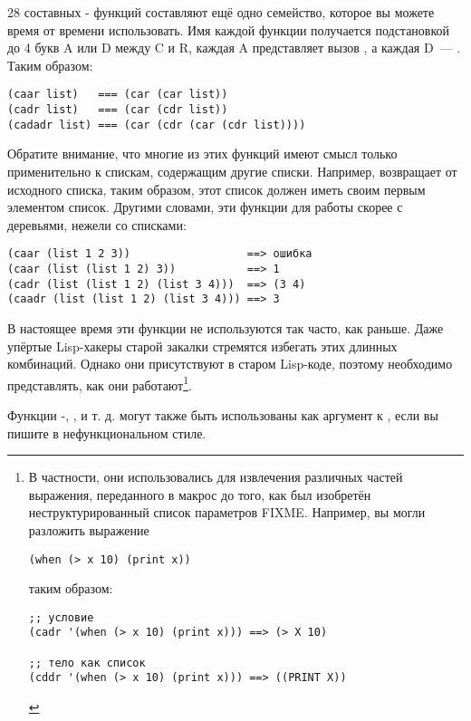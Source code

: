 28 составных - функций составляют ещё одно семейство, которое вы можете время
от времени использовать. Имя каждой функции получается подстановкой до 4 букв A или D
между C и R, каждая A представляет вызов , а каждая D~--- . Таким
образом:

\begin{lstlisting}
(caar list)   === (car (car list))
(cadr list)   === (car (cdr list))
(cadadr list) === (car (cdr (car (cdr list))))
\end{lstlisting}

Обратите внимание, что многие из этих функций имеют смысл только применительно к спискам,
содержащим другие списки. Например,  возвращает  от 
исходного списка, таким образом, этот список должен иметь своим первым элементом
список. Другими словами, эти функции для работы скорее с деревьями, нежели со списками:

\begin{lstlisting}
(caar (list 1 2 3))                  ==> ошибка
(caar (list (list 1 2) 3))           ==> 1
(cadr (list (list 1 2) (list 3 4)))  ==> (3 4)
(caadr (list (list 1 2) (list 3 4))) ==> 3
\end{lstlisting}

В настоящее время эти функции не используются так часто, как раньше. Даже упёртые
Lisp-хакеры старой закалки стремятся избегать этих длинных комбинаций. Однако они
присутствуют в старом Lisp-коде, поэтому необходимо представлять, как они
работают\footnote{В частности, они использовались для извлечения различных частей
  выражения, переданного в макрос до того, как был изобретён неструктурированный список
  параметров FIXME. Например, вы могли разложить выражение

\begin{lstlisting}
(when (> x 10) (print x))
\end{lstlisting}

таким образом:

\begin{lstlisting}
;; условие
(cadr '(when (> x 10) (print x))) ==> (> X 10)

;; тело как список
(cddr '(when (> x 10) (print x))) ==> ((PRINT X))
\end{lstlisting}
}.

Функции -, ,  и т. д. могут также быть
использованы как аргумент к , если вы пишите в нефункциональном стиле.


